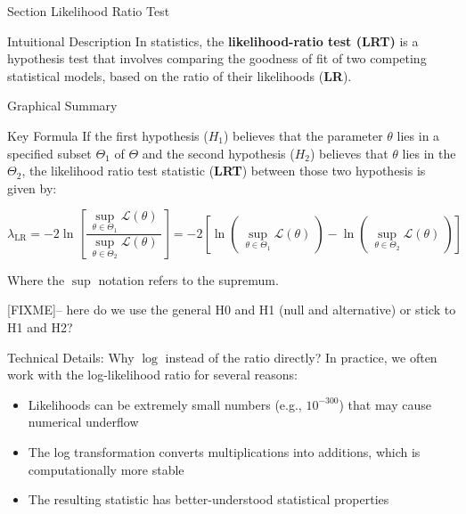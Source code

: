 
\begin{frame}{Section}
\centering
\Huge{Likelihood Ratio Test}
\end{frame}


\begin{frame}{Intuitional Description}
In statistics, the \textbf{likelihood-ratio test (LRT)} is a hypothesis test that involves comparing the goodness of fit of two competing statistical models, based on the ratio of their likelihoods (\textbf{LR}).
\end{frame}

\begin{frame}{Graphical Summary}

\end{frame}


\begin{frame}{Key Formula}
If the first hypothesis ($H_1$) believes that the parameter $\theta$ lies in a specified subset $\Theta_1$ of $\Theta$ and the second hypothesis ($H_2$) believes that $\theta$ lies in the $\Theta_2$, the likelihood ratio test statistic (\textbf{LRT}) between those two hypothesis is given by:

$$
\lambda_{\text{LR}}=-2\ln \left[{\frac {~\sup_{\theta \in \Theta_1}{\mathcal{L}}(\theta)~}{~\sup_{\theta \in \Theta_2}{\mathcal{L}}(\theta)~}}\right] = -2 \left[ \ln \left( ~\sup_{\theta \in \Theta_1}{\mathcal{L}}(\theta)~\right) -\ln \left( ~\sup_{\theta \in \Theta_2}{\mathcal{L}}(\theta)~\right) \right]
$$

Where the $\sup$ notation refers to the supremum.

[FIXME]-- here do we use the general H0 and H1 (null and alternative) or stick to H1 and H2?
\end{frame}


\begin{frame}{Technical Details: Why $\log$ instead of the ratio directly?}
In practice, we often work with the log-likelihood ratio for several reasons:
\begin{itemize}
\item Likelihoods can be extremely small numbers (e.g., $10^{-300}$) that may cause numerical underflow
\item The log transformation converts multiplications into additions, which is computationally more stable
\item The resulting statistic has better-understood statistical properties
\end{itemize}

\end{frame}

